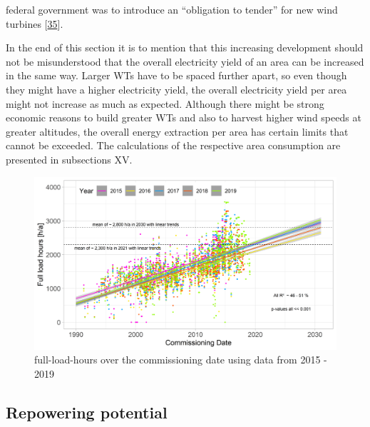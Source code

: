 \documentclass[a4paper,11pt]{article}
\begin{document}
federal government was to introduce an ``obligation to tender'' for new wind turbines {[}\protect\hyperlink{ref-NickSchader.2021}{35}{]}.

In the end of this section it is to mention that this increasing development should not be misunderstood that the overall electricity yield of an area can be increased in the same way. Larger WTs have to be spaced further apart, so even though they might have a higher electricity yield, the overall electricity yield per area might not increase as much as expected. Although there might be strong economic reasons to build greater WTs and also to harvest higher wind speeds at greater altitudes, the overall energy extraction per area has certain limits that cannot be exceeded. The calculations of the respective area consumption are presented in subsections XV.
\begin{figure}[H]

{\centering \includegraphics[width=1\linewidth]{data/Amprion/results_of_analysis/flh} 

}

\caption{full-load-hours over the commissioning date using data from 2015 - 2019}\label{fig:full}
\end{figure}
\hypertarget{repowering-potential}{%
\subsection{Repowering potential}\label{repowering-potential}}
\end{document}
